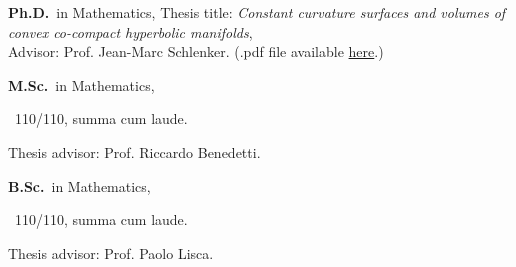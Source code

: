 	{%
		\textbf{Ph.D.}~in Mathematics,}
	{%
	Thesis title: \emph{Constant curvature surfaces and volumes of convex co-compact hyperbolic manifolds}, \\
	Advisor: Prof. Jean-Marc Schlenker. (.pdf file available \href{https://orbilu.uni.lu/handle/10993/43901}{here}.)}

		{%
			\textbf{M.Sc.}~in Mathematics, \begin{footnotesize}
			~110/110, summa cum laude.
		\end{footnotesize}}
		{Thesis advisor: Prof. Riccardo Benedetti.}

{%
	\textbf{B.Sc.}~in Mathematics, \begin{footnotesize}
	~110/110, summa cum laude.
\end{footnotesize}}{Thesis advisor: Prof. Paolo Lisca.}